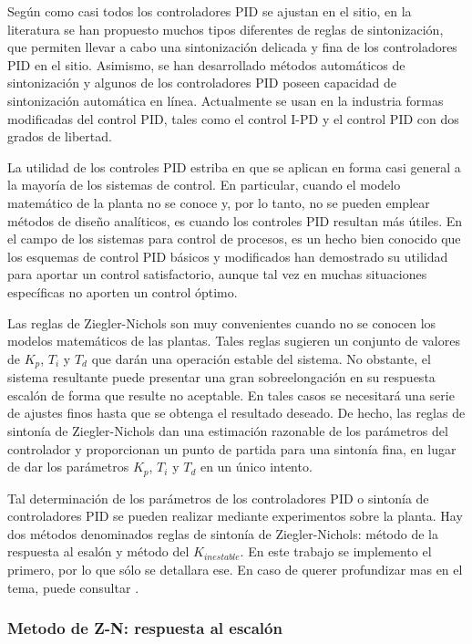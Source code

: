 \documentclass[10pt,conference,a4paper,onecolumn]{article}%
\begin{document}
Según \cite{ogata} como casi todos los controladores PID se ajustan en el sitio, en la literatura se han propuesto muchos tipos diferentes de reglas de sintonización, que permiten llevar a cabo una sintonización delicada y fina de los controladores PID en el sitio. Asimismo, se han desarrollado métodos automáticos de sintonización y algunos de los controladores PID poseen capacidad de sintonización automática en línea. Actualmente se usan en la industria formas modificadas del control PID, tales como el control I-PD y el control PID con dos grados de libertad.

La utilidad de los controles PID estriba en que se aplican en forma casi general a la mayoría de los sistemas de control. En particular, cuando el modelo matemático de la planta no se conoce y, por lo tanto, no se pueden emplear métodos de diseño analíticos, es cuando los controles PID resultan más útiles. En el campo de los sistemas para control de procesos, es un hecho bien conocido que los esquemas de control PID básicos y modificados han demostrado su utilidad para aportar un control satisfactorio, aunque tal vez en muchas situaciones específicas no aporten un control óptimo.

Las reglas de Ziegler-Nichols son muy convenientes cuando no se conocen los modelos matemáticos de las plantas. Tales reglas sugieren un conjunto de valores de $K_p$, $T_i$ y $T_d$ que darán una operación estable del sistema. No obstante, el sistema resultante puede presentar una gran sobreelongación en su respuesta escalón de forma que resulte no aceptable. En tales casos se necesitará una serie de ajustes finos hasta que se obtenga el resultado deseado. De hecho, las reglas de sintonía de Ziegler-Nichols dan una estimación razonable de los parámetros del controlador y proporcionan un punto de partida para una sintonía fina, en lugar de dar los parámetros $K_p$, $T_i$ y $T_d$ en un único intento.

Tal determinación de los parámetros de los controladores PID o sintonía de controladores PID se pueden realizar mediante experimentos sobre la planta. Hay dos métodos denominados reglas de sintonía de Ziegler-Nichols: método de la respuesta al esalón y método del $K_{inestable}$. En este trabajo se implemento el primero, por lo que sólo se detallara ese. En caso de querer profundizar mas en el tema, puede consultar \cite{biblia_PID} \cite{paginaPID}. 

\subsubsection{Metodo de Z-N: respuesta al escalón}
\end{document}
